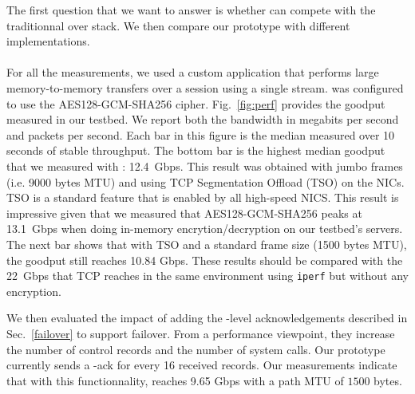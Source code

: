 The first question that we want to answer is whether \tcpls can compete with the
traditionnal \tls over \tcp stack. We then compare our \tcpls prototype with
different \quic implementations.


\paragraph*{\tcpls}
For all the \tcpls measurements, we used a custom application that performs
large memory-to-memory transfers over a \tcpls session using a single stream.
\tcpls was configured to use the AES128-GCM-SHA256 cipher.
Fig.~\ref{fig:perf} provides the goodput measured in our
testbed. We report both the bandwidth in megabits per second and packets per
second. Each bar in this figure is the median measured over 10 seconds of stable
throughput. The bottom bar is the highest median goodput that we measured with \tcpls:
12.4~Gbps. This result was obtained with jumbo frames (i.e. 9000 bytes MTU)
and using TCP Segmentation Offload (TSO) on the NICs. TSO is a standard feature
that is enabled by all high-speed NICS. This result is impressive given that
we measured that
AES128-GCM-SHA256 peaks at 13.1~Gbps when doing in-memory encrytion/decryption on our
testbed's servers. 
The next bar shows that with TSO and a
standard frame size (1500 bytes MTU), the goodput still reaches 10.84 Gbps. These
results should be compared with the 22~Gbps that TCP reaches in the same
environment using \texttt{iperf} but without any encryption. 


We then evaluated the impact of adding the \tcpls-level acknowledgements
described in Sec.~\ref{failover} to support failover.
From a performance viewpoint, they increase the number of control records and
the number of system calls. Our prototype currently sends a \tcpls-ack for every
16 received records. Our measurements indicate that with this functionnality,
\tcpls reaches 9.65 Gbps with a path MTU of $1500$ bytes.


